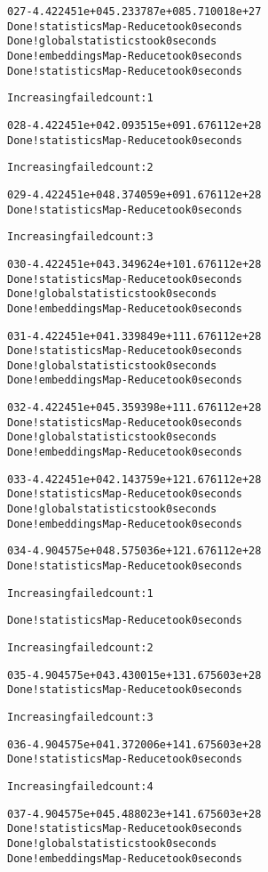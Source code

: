 \documentclass[letterpaper,10pt,english]{/usr/share/sphinx/texinputs/sphinxhowto}
\newenvironment{InvisibleVerbatim}
        {\begin{mdframed}[leftmargin=0.1\linewidth,innerleftmargin=3pt,innerrightmargin=3pt, userdefinedwidth=1\linewidth, linewidth=0pt, linecolor=white, usetwoside=false]}
        {\end{mdframed}}
\begin{document}
\begin{InvisibleVerbatim}
\begin{alltt}
 027  -4.422451e+04   5.233787e+08   5.710018e+27
Done! statistics Map-Reduce took  0  seconds
Done! global statistics took  0  seconds
Done! embeddings Map-Reduce took  0  seconds
Done! statistics Map-Reduce took  0  seconds

        Increasing failed count: 1


 028  -4.422451e+04   2.093515e+09   1.676112e+28
Done! statistics Map-Reduce took  0  seconds

        Increasing failed count: 2


 029  -4.422451e+04   8.374059e+09   1.676112e+28
Done! statistics Map-Reduce took  0  seconds

        Increasing failed count: 3


 030  -4.422451e+04   3.349624e+10   1.676112e+28
Done! statistics Map-Reduce took  0  seconds
Done! global statistics took  0  seconds
Done! embeddings Map-Reduce took  0  seconds

 031  -4.422451e+04   1.339849e+11   1.676112e+28
Done! statistics Map-Reduce took  0  seconds
Done! global statistics took  0  seconds
Done! embeddings Map-Reduce took  0  seconds

 032  -4.422451e+04   5.359398e+11   1.676112e+28
Done! statistics Map-Reduce took  0  seconds
Done! global statistics took  0  seconds
Done! embeddings Map-Reduce took  0  seconds

 033  -4.422451e+04   2.143759e+12   1.676112e+28
Done! statistics Map-Reduce took  0  seconds
Done! global statistics took  0  seconds
Done! embeddings Map-Reduce took  0  seconds

 034  -4.904575e+04   8.575036e+12   1.676112e+28
Done! statistics Map-Reduce took  0  seconds

        Increasing failed count: 1

Done! statistics Map-Reduce took  0  seconds

        Increasing failed count: 2


 035  -4.904575e+04   3.430015e+13   1.675603e+28
Done! statistics Map-Reduce took  0  seconds

        Increasing failed count: 3


 036  -4.904575e+04   1.372006e+14   1.675603e+28
Done! statistics Map-Reduce took  0  seconds

        Increasing failed count: 4


 037  -4.904575e+04   5.488023e+14   1.675603e+28
Done! statistics Map-Reduce took  0  seconds
Done! global statistics took  0  seconds
Done! embeddings Map-Reduce took  0  seconds


\end{alltt}
\end{InvisibleVerbatim}
\end{document}
